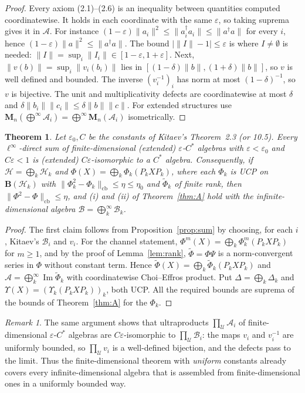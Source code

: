 \documentclass[11pt]{article}
\newtheorem{theorem}{Theorem}
\theoremstyle{remark}
\newtheorem{remark}[proposition]{Remark}
\newcommand{\eps}{\varepsilon}
\newcommand{\cA}{\mathcal{A}}
\newcommand{\cB}{\mathcal{B}}
\newcommand{\cH}{\mathcal{H}}
\newcommand{\Bo}{\mathbf{B}}
\newcommand{\cb}{\mathrm{cb}}
\newcommand{\Img}{\operatorname{Im}}
\newcommand{\wt}{\widetilde}
\newcommand{\Ma}[1]{\mathbf{M}_{#1}}
\begin{document}
\begin{proof}
Every axiom (2.1)--(2.6) is an inequality between quantities computed coordinatewise. It holds in each coordinate with the same $\eps$, so taking suprema gives it in $\cA$. For instance $(1-\eps)\|a_i\|^2\le\|a_i^\dagger a_i\|\le\|a^\dagger a\|$ for every $i$, hence $(1-\eps)\|a\|^2\le\|a^\dagger a\|$. The bound $|\|I\|-1|\le\eps$ is where $I\ne\emptyset$ is needed: $\|I\|=\sup_i\|I_i\|\in[1-\eps,1+\eps]$. Next, $\|v(b)\|=\sup_i\|v_i(b_i)\|$ lies in $[(1-\delta)\|b\|,(1+\delta)\|b\|]$, so $v$ is well defined and bounded. The inverse $(v_i^{-1})_i$ has norm at most $(1-\delta)^{-1}$, so $v$ is bijective. The unit and multiplicativity defects are coordinatewise at most $\delta$ and $\delta\|b_i\|\|c_i\|\le\delta\|b\|\|c\|$. For extended structures use $\Ma{n}(\bigoplus^\infty\cA_i)=\bigoplus^\infty\Ma{n}(\cA_i)$ isometrically.
\end{proof}

\begin{theorem}\label{thm:B}
Let $\eps_0,C$ be the constants of Kitaev's Theorem~2.3 (or 10.5). Every $\ell^\infty$-direct sum of finite-dimensional (extended) $\eps$-$C^*$ algebras with $\eps<\eps_0$ and $C\eps<1$ is (extended) $C\eps$-isomorphic to a $C^*$ algebra. Consequently, if $\cH=\bigoplus_k\cH_k$ and $\Phi(X)=\bigoplus_k\Phi_k(P_kXP_k)$, where each $\Phi_k$ is UCP on $\Bo(\cH_k)$ with $\|\Phi_k^2-\Phi_k\|_\cb\le\eta\le\eta_0$ and $\wt\Phi_k$ of finite rank, then $\|\Phi^2-\Phi\|_\cb\le\eta$, and (i) and (ii) of Theorem~\ref{thm:A} hold with the infinite-dimensional algebra $\cB=\bigoplus^\infty_k\cB_k$.
\end{theorem}

\begin{proof}
The first claim follows from Proposition~\ref{prop:sum} by choosing, for each $i$, Kitaev's $\cB_i$ and $v_i$. For the channel statement, $\Phi^m(X)=\bigoplus_k\Phi_k^m(P_kXP_k)$ for $m\ge1$, and by the proof of Lemma~\ref{lem:rank}, $\wt\Phi=\Phi\Psi$ is a norm-convergent series in $\Phi$ without constant term. Hence $\wt\Phi(X)=\bigoplus_k\wt\Phi_k(P_kXP_k)$ and $\cA=\bigoplus^\infty_k\Img\wt\Phi_k$ with coordinatewise Choi--Effros product. Put $\Delta=\bigoplus_k\Delta_k$ and $\Upsilon(X)=(\Upsilon_k(P_kXP_k))_k$, both UCP. All the required bounds are suprema of the bounds of Theorem~\ref{thm:A} for the $\Phi_k$.
\end{proof}

\begin{remark}
The same argument shows that ultraproducts $\prod_\mathcal{U}\cA_i$ of finite-dimensional $\eps$-$C^*$ algebras are $C\eps$-isomorphic to $\prod_\mathcal{U}\cB_i$: the maps $v_i$ and $v_i^{-1}$ are uniformly bounded, so $\prod_\mathcal{U}v_i$ is a well-defined bijection, and the defects pass to the limit. Thus the finite-dimensional theorem with \emph{uniform} constants already covers every infinite-dimensional algebra that is assembled from finite-dimensional ones in a uniformly bounded way.
\end{remark}
\end{document}
